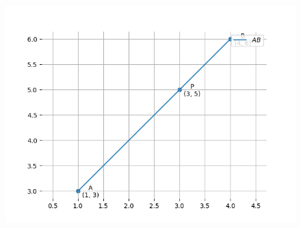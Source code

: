 \documentclass[journal]{IEEEtran}
\begin{document}
\begin{figure}[H]
	\centering
	\includegraphics[width = 0.8\columnwidth]{q1.2.png}
	\caption*{}
	\label{q1.2}
\end{figure}
\end{document}
